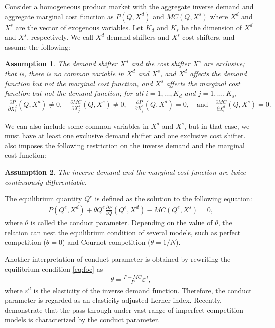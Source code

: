 \documentclass[11pt, a4paper]{article}
\newtheorem{assumption}{Assumption}
\theoremstyle{remark}
\begin{document}
Consider a homogeneous product market with the aggregate inverse demand and aggregate marginal cost function as $P(Q, X^{d})$ and $MC(Q, X^{s})$ where $X^{d}$ and $X^{s}$ are the vector of exogenous variables.
Let $K_d$ and $K_s$ be the dimension of $X^{d}$ and $X^{s}$, respectively.
We call $X^{d}$ demand shifters and $X^{s}$ cost shifters, and assume the following:
\begin{assumption}\label{assumption:exclusive_shifters}
    The demand shifter $X^{d}$ and the cost shifter $X^{s}$ are exclusive; that is, there is no common variable in $X^{d}$ and $X^{s}$, and $X^{d}$ affects the demand function but not the marginal cost function, and $X^{s}$ affects the marginal cost function but not the demand function; for all $i = 1, \ldots, K_d$ and $j = 1, \ldots, K_s$,
    \begin{align}
        \frac{\partial P}{\partial X^{d}_{i}}(Q, X^{d}) \ne 0, \quad \frac{\partial MC}{\partial X^{s}_{j}}(Q, X^{s}) \ne 0, \quad \frac{\partial P}{\partial X^{s}_{j}}(Q, X^{d}) = 0, \quad \text{and} \quad \frac{\partial MC}{\partial X^{d}_{i}}(Q, X^{s}) = 0.
    \end{align}
\end{assumption}
We can also include some common variables in $X^{d}$ and $X^{s}$, but in that case, we must have at least one exclusive demand shifter and one exclusive cost shifter.
\citet{lau1982identifying} also imposes the following restriction on the inverse demand and the marginal cost function:
\begin{assumption}\label{assumption:twice_differentiable}
    The inverse demand and the marginal cost function are twice continuously differentiable.
\end{assumption}

The equilibrium quantity $Q^e$ is defined as the solution to the following equation:
\begin{align}
    P(Q^e, X^{d}) + \theta Q^e\frac{\partial P}{\partial Q}(Q^e, X^{d}) - MC(Q^e, X^{s}) = 0, \label{eq:foc}
\end{align}
where $\theta$ is called the conduct parameter.
Depending on the value of $\theta$, the relation can nest the equilibrium condition of several models, such as perfect competition ($\theta=0$) and Cournot competition ($\theta=1/N$).

Another interpretation of conduct parameter is obtained by rewriting the equilibrium condition \eqref{eq:foc} as
\begin{align}
    \theta = \frac{P - MC}{P}\varepsilon^{d},
\end{align}
where $\varepsilon^{d}$ is the elasticity of the inverse demand function.
Therefore, the conduct parameter is regarded as an elasticity-adjusted Lerner index.
Recently, \citet{weylPassThrough2013} demonstrate that the pass-through under vast range of imperfect competition models is characterized by the conduct parameter.
\end{document}
